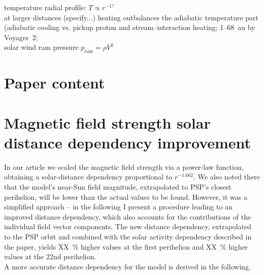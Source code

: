 temperature radial profile: $T \propto r^{-1?}$\\
	at larger distances (specify...) heating outbalances the adiabatic temperature part (adiabatic cooling vs. pickup proton and stream--interaction heating; 1--68~au by Voyager~2; \citet{Richardson2003}\\
solar wind ram pressure $p_\text{ram} = \rho V^2$\\


\section{Paper content}


\section{Magnetic field strength solar distance dependency improvement}
In our article we scaled the magnetic field strength via a power-law function, obtaining a solar-distance dependency proportional to $r^{-1.662}$. We also noted there that the model's near-Sun field magnitude, extrapolated to PSP's closest perihelion, will be lower than the actual values to be found. However, it was a simplified approach -- in the following I present a procedure leading to an improved distance dependency, which also accounts for the contributions of the individual field vector components. The new distance dependency, extrapolated to the PSP orbit and combined with the solar activity dependency described in the paper, yields XX~\% higher values at the first perihelion and XX~\% higher values at the 22nd perihelion.\\

A more accurate distance dependency for the model is derived in the following.\\

